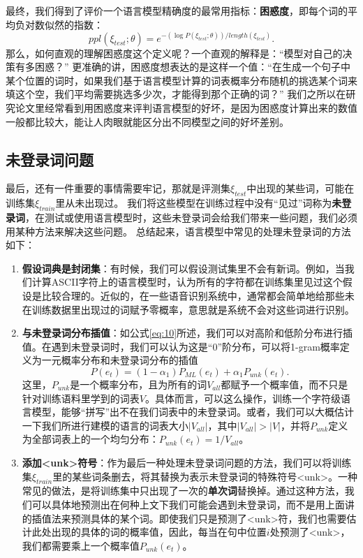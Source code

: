 \documentclass[10pt,a4paper]{ctexart}
\begin{document}
最终，我们得到了评价一个语言模型精确度的最常用指标：\textbf{困惑度}，即每个词的平均负对数似然的指数：
\begin{equation}\label{eq:15}
 ppl(\xi_{test};\theta) = e^{-(\log P(\xi_{test};\theta))/length(\xi_{test})}.
\end{equation}
那么，如何直观的理解困惑度这个定义呢？一个直观的解释是：“模型对自己的决策有多困惑？”
更准确的讲，困惑度想表达的是这样一个值：“在生成一个句子中某个位置的词时，如果我们基于语言模型计算的词表概率分布随机的挑选某个词来填这个空，我们平均需要挑选多少次，才能得到那个正确的词？”
我们之所以在研究论文里经常看到用困惑度来评判语言模型的好坏，是因为困惑度计算出来的数值一般都比较大，能让人肉眼就能区分出不同模型之间的好坏差别。

\subsection{未登录词问题}
最后，还有一件重要的事情需要牢记，那就是评测集$\xi_{test}$中出现的某些词，可能在训练集$\xi_{train}$里从未出现过。
我们将这些模型在训练过程中没有“见过”词称为\textbf{未登录词}，在测试或使用语言模型时，这些未登录词会给我们带来一些问题，我们必须用某种方法来解决这些问题。
总结起来，语言模型中常见的处理未登录词的方法如下：
\begin{enumerate}
\item[] \textbf{假设词典是封闭集}：有时候，我们可以假设测试集里不会有新词。例如，当我们计算ASCII字符上的语言模型时，认为所有的字符都在训练集里见过这个假设是比较合理的。近似的，在一些语音识别系统中，通常都会简单地给那些未在训练数据里出现过的词赋予零概率，意思就是系统不会对这些词进行识别。
\item[] \textbf{与未登录词分布插值}：如公式\ref{eq:10}所述，我们可以对高阶和低阶分布进行插值。在遇到未登录词时，我们可以认为这是“0”阶分布，可以将1-gram概率定义为一元概率分布和未登录词分布的插值\begin{equation}\label{eq:16} P(e_t) = (1 - \alpha_1)P_{ML}(e_t) + \alpha_1 P_{unk}(e_t).\end{equation}这里，$P_{unk}$是一个概率分布，且为所有的词$V_{all}$都赋予一个概率值，而不只是针对训练语料里学到的词表$V$。具体而言，可以这么操作，训练一个字符级语言模型，能够“拼写”出不在我们词表中的未登录词。或者，我们可以大概估计一下我们所进行建模的语言的词表大小$|V_{all}|$，其中$|V_{all}| > |V|$，并将$P_{unk}$定义为全部词表上的一个均匀分布：$P_{unk}(e_t) = 1 / {V_{all}}$。
\item[] \textbf{添加<unk>符号}：作为最后一种处理未登录词问题的方法，我们可以将训练集$\xi_{train}$里的某些词条删去，将其替换为表示未登录词的特殊符号<unk>。一种常见的做法，是将训练集中只出现了一次的\textbf{单次词}替换掉。通过这种方法，我们可以具体地预测出在何种上文下我们可能会遇到未登录词，而不是用上面讲的插值法来预测具体的某个词。即使我们只是预测了<unk>符，我们也需要估计此处出现的具体的词的概率值，因此，每当在句中位置$i$处预测了<unk>，我们都需要乘上一个概率值$P_{unk}(e_t)$。
\end{enumerate}
\end{document}
